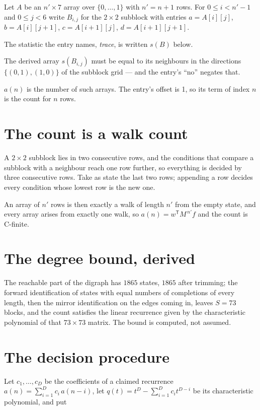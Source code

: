 \documentclass[11pt]{article}
\theoremstyle{definition}
\begin{document}
Let $A$ be an $n' \times 7$ array over $\{0,\dots,1\}$ with $n' = n + 1$ rows. For $0 \le i < n'-1$ and $0 \le j < 6$ write $B_{i,j}$ for the $2\times2$ subblock with entries $a = A[i][j]$, $b = A[i][j{+}1]$, $c = A[i{+}1][j]$, $d = A[i{+}1][j{+}1]$.

The statistic the entry names, {\itshape trace}, is written $s(B)$ below.

The derived array $s(B_{i,j})$ must be equal to its neighbours in the directions $\{(0,1), (1,0)\}$ of the subblock grid --- and the entry's ``no'' negates that.

$a(n)$ is the number of such arrays. The entry's offset is 1, so its term of index $n$ is the count for $n$ rows.

\section{The count is a walk count}

A $2\times2$ subblock lies in two consecutive rows, and the conditions that compare a subblock with a neighbour reach one row further, so everything is decided by three consecutive rows. Take as state the last two rows; appending a row decides every condition whose lowest row is the new one.

An array of $n'$ rows is then exactly a walk of length $n'$ from the empty state, and every array arises from exactly one walk, so $a(n) = w^{\mathsf T}M^{\,n'}f$ and the count is C-finite.

\section{The degree bound, derived}

The reachable part of the digraph has $1865$ states, $1865$ after trimming; the forward identification of states with equal numbers of completions of every length, then the mirror identification on the edges coming in, leaves $S = 73$ blocks, and the count satisfies the linear recurrence given by the characteristic polynomial of that $73\times73$ matrix. The bound is computed, not assumed.

\section{The decision procedure}

Let $c_1,\dots,c_D$ be the coefficients of a claimed recurrence $a(n) = \sum_{i=1}^{D} c_i\,a(n-i)$, let $q(t) = t^{D} - \sum_{i=1}^{D} c_i t^{D-i}$ be its characteristic polynomial, and put
\end{document}
